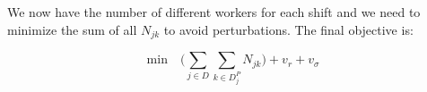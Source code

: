 \documentclass[../../thesis.tex]{subfiles}
\begin{document}
We now have the number of different workers for each shift and we need to minimize the sum of all $N_{jk}$ to avoid perturbations.
The final objective is:

\begin{equation}
  \text{min} \quad \big( \sum_{j \in D} \sum_{k \in D^P_j} N_{jk} \big) + v_r + v_{\sigma}
\end{equation}







\end{document}
